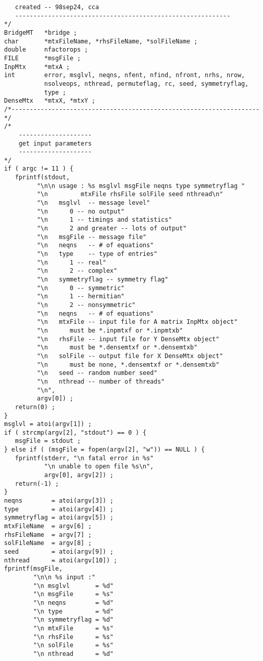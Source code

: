\begin{verbatim}
   created -- 98sep24, cca
   -----------------------------------------------------------
*/
BridgeMT   *bridge ;
char       *mtxFileName, *rhsFileName, *solFileName ;
double     nfactorops ; 
FILE       *msgFile ;
InpMtx     *mtxA ;
int        error, msglvl, neqns, nfent, nfind, nfront, nrhs, nrow, 
           nsolveops, nthread, permuteflag, rc, seed, symmetryflag, 
           type ;
DenseMtx   *mtxX, *mtxY ;
/*--------------------------------------------------------------------*/
/*
    --------------------
    get input parameters
    --------------------
*/
if ( argc != 11 ) {
   fprintf(stdout, 
         "\n\n usage : %s msglvl msgFile neqns type symmetryflag "
         "\n         mtxFile rhsFile solFile seed nthread\n"
         "\n   msglvl  -- message level"
         "\n      0 -- no output"
         "\n      1 -- timings and statistics"
         "\n      2 and greater -- lots of output"
         "\n   msgFile -- message file"
         "\n   neqns   -- # of equations"
         "\n   type    -- type of entries"
         "\n      1 -- real"
         "\n      2 -- complex"
         "\n   symmetryflag -- symmetry flag"
         "\n      0 -- symmetric"
         "\n      1 -- hermitian"
         "\n      2 -- nonsymmetric"
         "\n   neqns   -- # of equations"
         "\n   mtxFile -- input file for A matrix InpMtx object"
         "\n      must be *.inpmtxf or *.inpmtxb"
         "\n   rhsFile -- input file for Y DenseMtx object"
         "\n      must be *.densemtxf or *.densemtxb"
         "\n   solFile -- output file for X DenseMtx object"
         "\n      must be none, *.densemtxf or *.densemtxb"
         "\n   seed -- random number seed"
         "\n   nthread -- number of threads"
         "\n",
         argv[0]) ;
   return(0) ;
}
msglvl = atoi(argv[1]) ;
if ( strcmp(argv[2], "stdout") == 0 ) {
   msgFile = stdout ;
} else if ( (msgFile = fopen(argv[2], "w")) == NULL ) {
   fprintf(stderr, "\n fatal error in %s"
           "\n unable to open file %s\n",
           argv[0], argv[2]) ;
   return(-1) ;
}
neqns        = atoi(argv[3]) ;
type         = atoi(argv[4]) ;
symmetryflag = atoi(argv[5]) ;
mtxFileName  = argv[6] ;
rhsFileName  = argv[7] ;
solFileName  = argv[8] ;
seed         = atoi(argv[9]) ;
nthread      = atoi(argv[10]) ;
fprintf(msgFile, 
        "\n\n %s input :"
        "\n msglvl       = %d"
        "\n msgFile      = %s"
        "\n neqns        = %d"
        "\n type         = %d"
        "\n symmetryflag = %d"
        "\n mtxFile      = %s"
        "\n rhsFile      = %s"
        "\n solFile      = %s"
        "\n nthread      = %d"

\end{verbatim}
